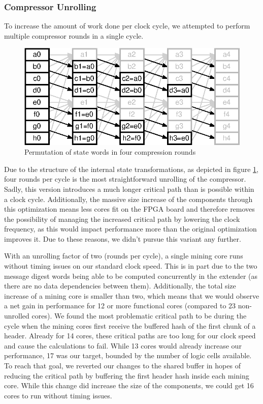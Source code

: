 \subsubsection*{Compressor Unrolling}

To increase the amount of work done per clock cycle, we attempted to perform multiple compressor rounds in a single cycle.

\begin{figure}
	\centering
	\includegraphics[width=\textwidth]{img/Compressor-dep.eps}
	\caption[Permutation of state words in four compression rounds]{Permutation of state words in four compression rounds}
	\label{fig:compressor-dep}
\end{figure}

Due to the structure of the internal state transformations, as depicted in figure \ref{fig:compressor-dep}, four rounds per cycle is the most straightforward unrolling of the compressor. Sadly, this version introduces a much longer critical path than is possible within a clock cycle. Additionally, the massive size increase of the components through this optimization means less cores fit on the FPGA board and therefore removes the possibility of managing the increased critical path by lowering the clock frequency, as this would impact performance more than the original optimization improves it. Due to these reasons, we didn't pursue this variant any further.

With an unrolling factor of two (rounds per cycle), a single mining core runs without timing issues on our standard clock speed. This is in part due to the two message digest words being able to be computed concurrently in the extender (as there are no data dependencies between them). Additionally, the total size increase of a mining core is smaller than two, which means that we would observe a net gain in performance for 12 or more functional cores (compared to 23 non-unrolled cores). We found the most problematic critical path to be during the cycle when the mining cores first receive the buffered hash of the first chunk of a header. Already for 14 cores, these critical paths are too long for our clock speed and cause the calculations to fail. While 13 cores would already increase our performance, 17 was our target, bounded by the number of logic cells available. To reach that goal, we reverted our changes to the shared buffer in hopes of reducing the critical path by buffering the first header hash inside each mining core. While this change did increase the size of the components, we could get 16 cores to run without timing issues.


